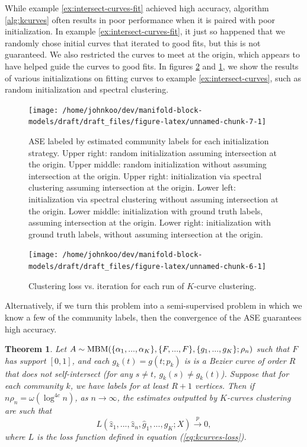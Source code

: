 \documentclass[
  12pt,
]{article}
\newtheorem{theorem}{Theorem}[section]
\theoremstyle{definition}
\theoremstyle{definition}
\theoremstyle{definition}
\theoremstyle{definition}
\theoremstyle{remark}
\begin{document}
While example \ref{ex:intersect-curves-fit} achieved high accuracy, algorithm \ref{alg:kcurves} often results in poor performance when it is paired with poor initialization.
In example \ref{ex:intersect-curves-fit}, it just so happened that we randomly chose initial curves that iterated to good fits, but this is not guaranteed.
We also restricted the curves to meet at the origin, which appears to have helped guide the curves to good fits.
In figures \ref{fig:loss} and \ref{fig:init-strategies}, we show the results of various initializations on fitting curves to example \ref{ex:intersect-curves}, such as random initialization and spectral clustering.

\begin{figure}[H]

{\centering \texttt{[image: /home/johnkoo/dev/manifold-block-models/draft/draft\_files/figure-latex/unnamed-chunk-7-1]} 

}

\caption{ASE labeled by estimated community labels for each initialization strategy. Upper right: random initialization assuming intersection at the origin. Upper middle: random initialization without assuming intersection at the origin. Upper right: initialization via spectral clustering assuming intersection at the origin. Lower left: initialization via spectral clustering without assuming intersection at the origin. Lower middle: initialization with ground truth labels, assuming intersection at the origin. Lower right: initialization with ground truth labels, without assuming intersection at the origin.}\label{fig:init-strategies}
\end{figure}

\begin{figure}

{\centering \texttt{[image: /home/johnkoo/dev/manifold-block-models/draft/draft\_files/figure-latex/unnamed-chunk-6-1]} 

}

\caption{Clustering loss vs. iteration for each run of $K$-curve clustering.}\label{fig:loss}
\end{figure}

Alternatively, if we turn this problem into a semi-supervised problem in which we know a few of the community labels, then the convergence of the ASE guarantees high accuracy.

\begin{theorem}
\label{thm:kcurves-semisupervised}
Let $A \sim \mathrm{MBM}(\{\alpha_1, ..., \alpha_K\}, \{F, ..., F\}, \{g_1, ..., g_K\}; \rho_n)$ such that $F$ has support $[0, 1]$, and each $g_k(t) = g(t; p_k)$ is is a Bezier curve of order $R$ that does not self-intersect (for any $s \neq t$, $g_k(s) \neq g_k(t)$). 
Suppose that for each community $k$, we have labels for at least $R + 1$ vertices. 
Then if $n \rho_n = \omega(\log^{4c} n)$, as $n \to \infty$, the estimates outputted by $K$-curves clustering are such that 
$$L(\hat{z}_1, ..., \hat{z}_n, \hat{g}_1, ..., \hat{g}_K; X) \stackrel{p}{\to} 0,$$
where $L$ is the loss function defined in equation (\ref{eq:kcurves-loss}). 
\end{theorem}
\end{document}
